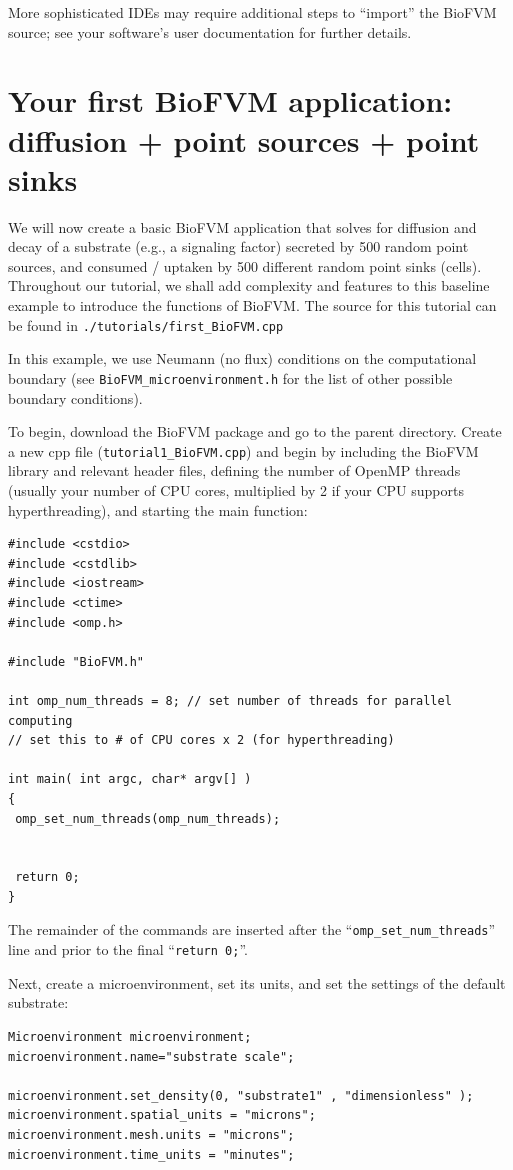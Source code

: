 \documentclass[11pt]{article}
\begin{document}
More sophisticated IDEs may require additional steps to ``import'' the BioFVM source; see
your software's user documentation for further details.

\section{Your first BioFVM application: diffusion + point sources + point sinks}
\label{first_example}
We will now create a basic BioFVM application that solves for diffusion and decay of
a substrate (e.g., a signaling factor) secreted by 500 random point sources, and consumed / uptaken
by 500 different random point sinks (cells). Throughout our tutorial, we shall add complexity
and features to this baseline example to introduce the functions of BioFVM.
The source for this tutorial can be found in \verb:./tutorials/first_BioFVM.cpp:

In this example, we use Neumann (no flux) conditions on the computational boundary
(see \newline \verb:BioFVM_microenvironment.h: for the list of other possible boundary conditions).

To begin, download the BioFVM package and go to the parent directory.
Create a new cpp file (\verb:tutorial1_BioFVM.cpp:) and begin by including
the BioFVM library and relevant header files, defining the number of OpenMP threads
(usually your number of CPU cores, multiplied by 2 if your CPU supports hyperthreading),
and starting the main function:

\begin{verbatim}
#include <cstdio>
#include <cstdlib>
#include <iostream>
#include <ctime>
#include <omp.h>

#include "BioFVM.h"

int omp_num_threads = 8; // set number of threads for parallel computing
// set this to # of CPU cores x 2 (for hyperthreading)

int main( int argc, char* argv[] )
{
 omp_set_num_threads(omp_num_threads);


 return 0;
}
\end{verbatim}
The remainder of the commands are inserted after the
``\verb:omp_set_num_threads:'' line and prior to
the final ``\verb:return 0;:''.

Next, create a microenvironment,
set its units, and set the settings of the default substrate:
\begin{verbatim}
Microenvironment microenvironment;
microenvironment.name="substrate scale";

microenvironment.set_density(0, "substrate1" , "dimensionless" );
microenvironment.spatial_units = "microns";
microenvironment.mesh.units = "microns";
microenvironment.time_units = "minutes";
\end{verbatim}
\end{document}

